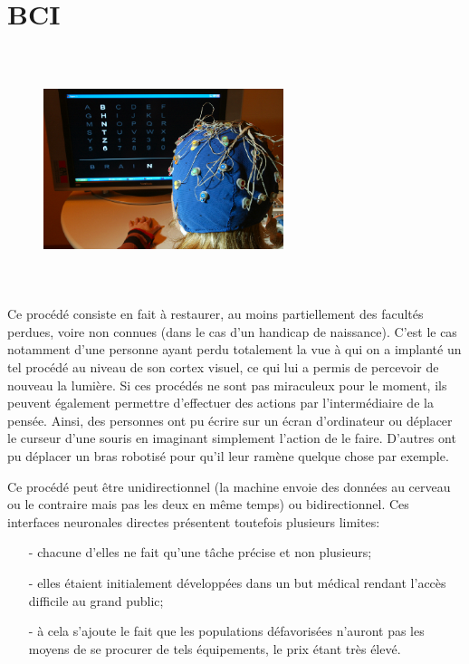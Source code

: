 	\section{BCI} %
				\begin{figure}[h]
		\centering 
	 	\includegraphics [width=7cm,height=7cm]{figures/bci3.png} \\
		\label{fig_captors}	
	\end{figure}
		Ce procédé consiste en fait à restaurer, au moins partiellement des facultés perdues, voire non connues (dans le cas d'un handicap de naissance). C'est le cas notamment d'une personne ayant perdu totalement la vue à qui on a implanté un tel procédé au niveau de son cortex visuel, ce qui lui a permis de percevoir de nouveau la lumière. Si ces procédés ne sont pas miraculeux pour le moment, ils peuvent également permettre d'effectuer des actions par l'intermédiaire de la pensée. Ainsi, des personnes ont pu écrire sur un écran d'ordinateur ou déplacer le curseur d'une souris en imaginant simplement l'action de le faire. D'autres ont pu déplacer un bras robotisé pour qu'il leur ramène quelque chose par exemple.

	Ce procédé peut être unidirectionnel (la machine envoie des données au cerveau ou le contraire mais pas les deux en même temps) ou bidirectionnel.
	Ces interfaces neuronales directes présentent toutefois plusieurs limites:
	\begin{itemize}
		\item [-] chacune d'elles ne fait qu'une tâche précise et non plusieurs;
		\item [-] elles étaient initialement développées dans un but médical rendant l'accès difficile au grand public;
		\item [-] à cela s'ajoute le fait que les populations défavorisées n'auront pas les moyens de se procurer de tels équipements, le prix étant très élevé.
	\end{itemize}
	\label{sec:bci}

